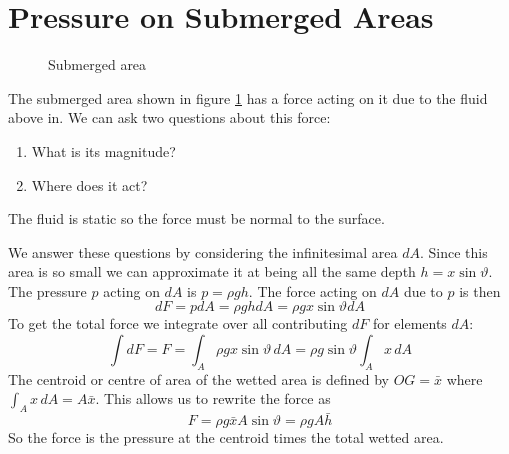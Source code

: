 \documentclass{article}
\begin{document}
    \section{Pressure on Submerged Areas}
    \begin{figure}[ht]
        \centering
        \caption{Submerged area}
        \label{fig:submerged area}
    \end{figure}
    The submerged area shown in figure \ref{fig:submerged area} has a force acting on it due to the fluid above in.
    We can ask two questions about this force:
    \begin{enumerate}
        \item What is its magnitude?
        \item Where does it act?
    \end{enumerate}
    The fluid is static so the force must be normal to the surface.
    
    We answer these questions by considering the infinitesimal area \(dA\). 
    Since this area is so small we can approximate it at being all the same depth \(h = x\sin\vartheta\).
    The pressure \(p\) acting on \(dA\) is \(p = \rho gh\).
    The force acting on \(dA\) due to \(p\) is then
    \[dF = pdA = \rho g hdA = \rho gx\sin\vartheta dA\]
    To get the total force we integrate over all contributing \(dF\)  for elements \(dA\):
    \[\int dF = F = \int_A\rho gx\sin\vartheta\,dA = \rho g\sin\vartheta\int_A x\,dA\]
    The centroid or centre of area of the wetted area is defined by \(OG = \bar x\) where \(\int_A x\,dA = A\bar x\).
    This allows us to rewrite the force as
    \[F = \rho g\bar x A\sin\vartheta = \rho g A\bar h\]
    So the force is the pressure at the centroid times the total wetted area.
    
\end{document}
